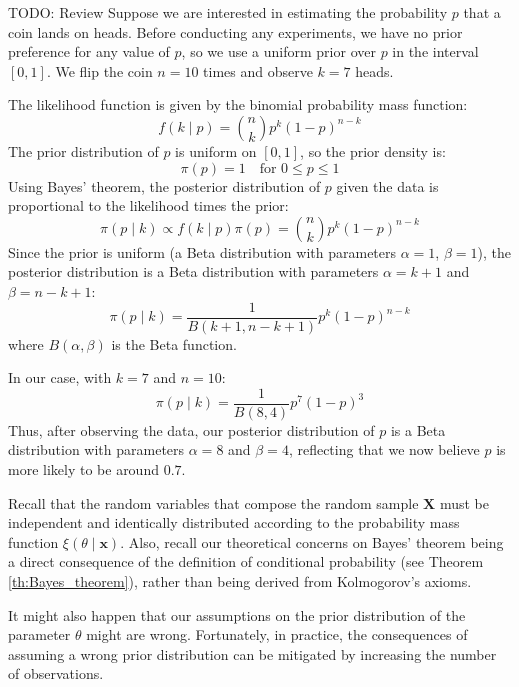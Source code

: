 \begin{example}
{\color{red} TODO: Review}
Suppose we are interested in estimating the probability $p$ that a coin lands on heads. Before conducting any experiments, we have no prior preference for any value of $p$, so we use a uniform prior over $p$ in the interval $[0,1]$. We flip the coin $n = 10$ times and observe $k = 7$ heads.

The likelihood function is given by the binomial probability mass function:
\[
f(k \mid p) = \binom{n}{k} p^{k} (1 - p)^{n - k}
\]
The prior distribution of $p$ is uniform on $[0,1]$, so the prior density is:
\[
\pi(p) = 1 \quad \text{for } 0 \leq p \leq 1
\]
Using Bayes' theorem, the posterior distribution of $p$ given the data is proportional to the likelihood times the prior:
\[
\pi(p \mid k) \propto f(k \mid p) \pi(p) = \binom{n}{k} p^{k} (1 - p)^{n - k}
\]
Since the prior is uniform (a Beta distribution with parameters $\alpha = 1$, $\beta = 1$), the posterior distribution is a Beta distribution with parameters $\alpha = k + 1$ and $\beta = n - k + 1$:
\[
\pi(p \mid k) = \frac{1}{B(k + 1, n - k + 1)} p^{k} (1 - p)^{n - k}
\]
where $B(\alpha, \beta)$ is the Beta function.

In our case, with $k = 7$ and $n = 10$:
\[
\pi(p \mid k) = \frac{1}{B(8, 4)} p^{7} (1 - p)^{3}
\]
Thus, after observing the data, our posterior distribution of $p$ is a Beta distribution with parameters $\alpha = 8$ and $\beta = 4$, reflecting that we now believe $p$ is more likely to be around $0.7$.
\end{example}

Recall that the random variables that compose the random sample $\mathbf{X}$ must be independent and identically distributed according to the probability mass function $\xi\left(\theta\mid\mathbf{x}\right)$. Also, recall our theoretical concerns on Bayes' theorem being a direct consequence of the definition of conditional probability (see Theorem \ref{th:Bayes_theorem}), rather than being derived from Kolmogorov's axioms.

It might also happen that our assumptions on the prior distribution of the parameter $\theta$ might are wrong. Fortunately, in practice, the consequences of assuming a wrong prior distribution can be mitigated by increasing the number of observations.

